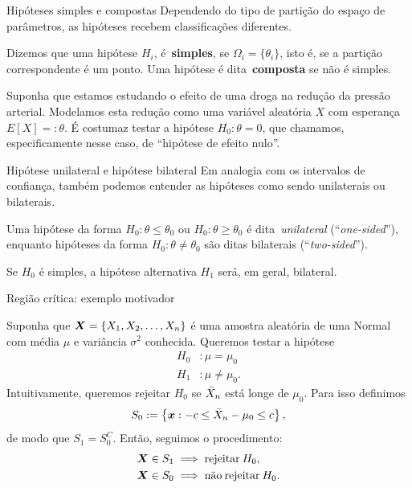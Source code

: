 \begin{frame}{Hipóteses simples e compostas}
 Dependendo do tipo de partição do espaço de parâmetros, as hipóteses recebem classificações diferentes.
 \begin{defn}
  Dizemos que uma hipótese $H_i$, é~\textbf{simples}, se $\Omega_i = \{ \theta_i \}$, isto é, se a partição correspondente é um ponto. 
  Uma hipótese é dita~\textbf{composta} se não é simples.
 \end{defn}
 
 \begin{exemplo}
  Suponha que estamos estudando o efeito de uma droga na redução da pressão arterial.
  Modelamos esta redução como uma variável aleatória $X$ com esperança $E[X] =: \theta$.
  É costumaz testar a hipótese $H_0 : \theta = 0$, que chamamos, especificamente nesse caso, de ``hipótese de efeito nulo''.
 \end{exemplo}
\end{frame}

\begin{frame}{Hipótese unilateral e hipótese bilateral}
 Em analogia com os intervalos de confiança, também podemos entender as hipóteses como sendo unilaterais ou bilaterais.
 \begin{defn}
  Uma hipótese da forma $H_0 : \theta \leq \theta_0$ ou $H_0 : \theta \geq \theta_0$ é dita~\textit{unilateral} (``\textit{one-sided}''), enquanto hipóteses da forma $H_0 : \theta \neq \theta_0$ são ditas bilaterais (``\textit{two-sided}'').
 \end{defn}
 
 \begin{obs}
 Se $H_0$ é simples, a hipótese alternativa $H_1$ será, em geral, bilateral.  
 \end{obs}
\end{frame}

\begin{frame}{Região crítica: exemplo motivador}
 \begin{exemplo}
  Suponha que $\boldsymbol{X} = \{ X_1, X_2, \ldots, X_n \}$ é uma amostra aleatória de uma Normal com média $\mu$ e variância $\sigma^2$ conhecida.
  Queremos testar a hipótese
  \begin{align*}
   H_0 &: \mu = \mu_0\\
   H_1 &: \mu \neq \mu_0.
  \end{align*}
  Intuitivamente, queremos rejeitar $H_0$ se $\bar{X}_n$ está longe de $\mu_0$.
  Para isso definimos
  \[ S_0 := \left\{ \boldsymbol{x}: -c \leq \bar{X}_n - \mu_0 \leq c \right\}, \]
  de modo que $S_1 = S_0^C$. 
  Então, seguimos o procedimento:
      \begin{align*}
   \boldsymbol{X} \in S_1 &\implies \text{rejeitar}\: H_0,\\
   \boldsymbol{X} \in S_0 &\implies \text{não\:rejeitar}\: H_0.\\
  \end{align*}
 \end{exemplo}
\end{frame}

